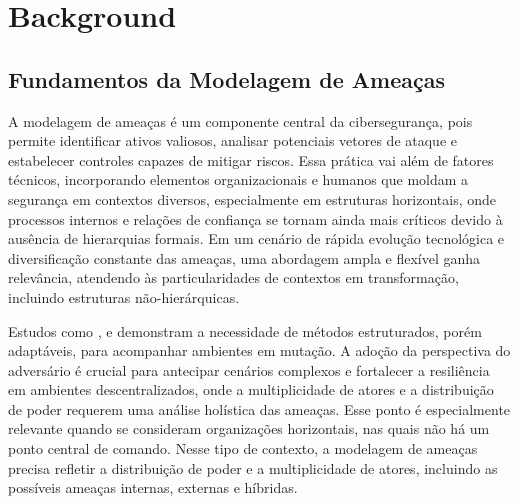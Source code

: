 
%

\chapter{Background} \label{cha:background}

\glsresetall

\section{Fundamentos da Modelagem de Ameaças}
\label{sec:fundamentos_da_modelagem_de_ameacas}

A modelagem de ameaças é um componente central da cibersegurança, pois
permite identificar ativos valiosos, analisar potenciais vetores de
ataque e estabelecer controles capazes de mitigar riscos. Essa prática
vai além de fatores técnicos, incorporando elementos organizacionais e
humanos que moldam a segurança em contextos diversos, especialmente em
estruturas horizontais, onde processos internos e relações de confiança
se tornam ainda mais críticos devido à ausência de hierarquias formais.
Em um cenário de rápida evolução tecnológica e diversificação constante
das ameaças, uma abordagem ampla e flexível ganha relevância, atendendo
às particularidades de contextos em transformação, incluindo estruturas
não-hierárquicas.

Estudos como \cite{ThreatModelingAsABasisForSecurityRequirements},
\cite{AdvancedThreatModeling} e
\cite{DemystifyingTheThreatModelingProcess} demonstram a necessidade
de métodos estruturados, porém adaptáveis, para acompanhar ambientes
em mutação. A adoção da perspectiva do adversário \cite{AHybridThreatModelingMethod}
é crucial para antecipar cenários complexos e fortalecer a resiliência
em ambientes descentralizados, onde a multiplicidade de atores e a
distribuição de poder requerem uma análise holística das ameaças.
Esse ponto é especialmente relevante quando se consideram organizações
horizontais, nas quais não há um ponto central de comando.
Nesse tipo de contexto, a modelagem de ameaças precisa refletir
a distribuição de poder e a multiplicidade de atores, incluindo as
possíveis ameaças internas, externas e híbridas.

